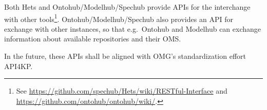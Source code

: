 \documentclass[10pt, a4paper]{isov2}
\begin{document}
\label{c:APIs}

Both Hets and Ontohub/Modelhub/Spechub provide APIs for the interchange
with other tools\footnote{See \url{https://github.com/spechub/Hets/wiki/RESTful-Interface} and \url{https://github.com/ontohub/ontohub/wiki/}.}. Ontohub/Modelhub/Spechub also provides an API for
exchange with other instances, so that e.g.\ Ontohub and Modelhub
can exchange information about available repositories and their OMS.

In the future, these APIs shall be aligned with OMG's standardization
effort API4KP.


\cleardoublepage
{}\label{a:loc/id}


\lstset{ %
  basicstyle=\small\ttfamily,
  breakatwhitespace=true,         %
  breaklines=true,                 %
  captionpos=b,                    %
  extendedchars=true,              %
  frame=single,                    %
  keepspaces=true,                 %
  numbersep=5pt,                   %
}
\end{document}

